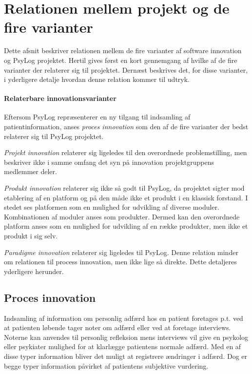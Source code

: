 \section{Relationen mellem projekt og de fire varianter}
Dette afsnit beskriver relationen mellem de fire varianter af software innovation\cite[Afsnit 5.1, Side 30-32]{art:essence} og PsyLog projektet.
Hertil gives først en kort gennemgang af hvilke af de fire varianter der relaterer sig til projektet.
Dernæst beskrives det, for disse varianter, i yderligere detalje hvordan denne relation kommer til udtryk.

\paragraph{Relaterbare innovationsvarianter}
Eftersom PsyLog repræsenterer en ny tilgang til indsamling af patientinformation, anses \textit{proces innovation} som den af de fire varianter der bedst relaterer sig til PsyLog projektet.

\textit{Projekt innovation} relaterer sig ligeledes til den overordnede problemstilling, men beskriver ikke i samme omfang det syn på innovation projektgruppens medlemmer deler.

\textit{Produkt innovation} relaterer sig ikke så godt til PsyLog, da projektet sigter mod etablering af en platform og på den måde ikke et produkt i en klassisk forstand.
I stedet ses platformen som en mulighed for udvikling af diverse moduler.
Kombinationen af moduler anses som produkter.
Dermed kan den overordnede platform anses som en mulighed for udvikling af en række produkter, men ikke et produkt i sig selv.

\textit{Paradigme innovation} relaterer sig ligeledes til PsyLog.
Denne relation minder om relationen til process innovation, men ikke lige så direkte.
Dette detaljeres yderligere herunder.


\subsection{Proces innovation}
Indsamling af information om personlig adfærd hos en patient foretages p.t. ved at patienten løbende tager noter om adfærd eller ved at foretage interviews.
Noterne kan anvendes til personlig refleksion mens interviews vil give en psykolog eller psykiater mulighed for at klarlægge patientens normale adfærd.
Med en af disse typer information bliver det muligt at registrere ændringer i adfærd.
Dog er begge typer information påvirket af patientens subjektive vurdering.

